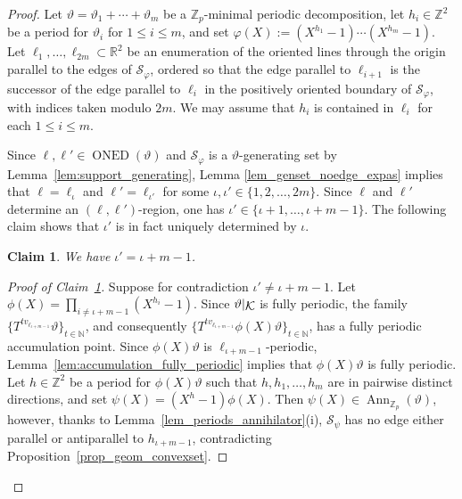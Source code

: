 \documentclass[12pt]{amsart}
\numberwithin{equation}{section}
\newtheorem{claim}[theorem]{Claim}
\DeclareMathOperator{\Ann}{Ann}
\DeclareMathOperator{\nexpd}{ONED}
\newcommand{\bb}[1]{\mathbb{#1}}
\newcommand{\sob}[1]{\ensuremath{{\mathbin |}\raise-.4ex\hbox{$#1$}}}
\begin{document}
\begin{proof}
Let \(\vartheta = \vartheta_1+\cdots+\vartheta_m\) be a \(\bb{Z}_p\)-minimal periodic decomposition, let $h_i \in
\mathbb{Z}^2$ be a period for $\vartheta_i$ for $1 \leq i \leq m$, and set  $\varphi(X) := (X^{h_1}-1) \cdots (X^{h_m}-1)$. Let $\pmb{\ell}_1,\ldots,\pmb{\ell}_{2m} \subset \bb{R}^2$ be an enumeration of the oriented lines through the origin parallel to the edges of $\mathcal{S}_{\varphi}$, ordered so that the edge parallel to $\pmb{\ell}_{i+1}$ is the successor of the edge parallel to $\pmb{\ell}_{i}$ in the positively oriented boundary of $\mathcal S_\varphi $, with indices taken modulo $2m$. We may assume that $h_i$ is contained in $\ell_i$ for each $1 \leq i \leq m$. 

Since $\pmb{\ell},\pmb{\ell}' \in \nexpd(\vartheta)$ and $\mathcal{S}_{\varphi}$ is a $\vartheta$-generating set by Lemma~\ref{lem:support_generating}, Lemma \ref{lem_genset_noedge_expas} implies that $\pmb{\ell} = \pmb{\ell}_{\iota}$ and $\pmb{\ell}' = \pmb{\ell}_{\iota'}$ for some $\iota,\iota' \in \{1,2,\ldots,2m\}$. Since $\pmb{\ell}$ and $\pmb{\ell}'$ determine an $(\pmb{\ell},\pmb{\ell}')$-region, one has $\iota' \in \{\iota+1, \ldots,\iota+m-1\}$. The following claim shows that $\iota'$ is in fact uniquely determined by $\iota$.

\begin{claim}\label{claim_iota}
We have $\iota' = \iota+m-1$.
\end{claim}

\begin{proof}[Proof of Claim~\ref{claim_iota}]
Suppose for contradiction $\iota' \neq \iota+m-1$.
Let $\phi(X) = \prod_{i \neq \iota+m-1}(X^{h_i}-1)$. Since $\vartheta\sob{\mathcal{K}}$ is fully periodic, the family $\{T^{t v_{\pmb{\ell}_{\iota+m-1}}}\vartheta\}_{t \in \bb{N}}$, and consequently $\{T^{t v_{\pmb{\ell}_{\iota+m-1}}}\phi(X)\vartheta\}_{t \in \bb{N}}$, has a fully periodic accumulation point. Since \(\phi(X)\vartheta\) is $\ell_{\iota+m-1}$-periodic, Lemma~\ref{lem:accumulation_fully_periodic} implies that \(\phi(X)\vartheta\) is fully periodic. Let $ h \in \bb{Z}^2 $ be a period for \(\phi(X)\vartheta\) such that \(h,h_1, \ldots, h_{m}\) are in pairwise distinct directions, and set $\psi(X) = (X^h-1)\phi(X)$. Then $\psi(X) \in \Ann_{\bb{Z}_p}(\vartheta)$, however, thanks to Lemma~\ref{lem_periods_annihilator}(i), $\mathcal{S}_{\psi}$ has no edge either parallel or antiparallel to $h_{\iota+m-1}$, contradicting Pro\-po\-si\-tion~\ref{prop_geom_convexset}.
\end{proof}


\end{proof}
\end{document}
